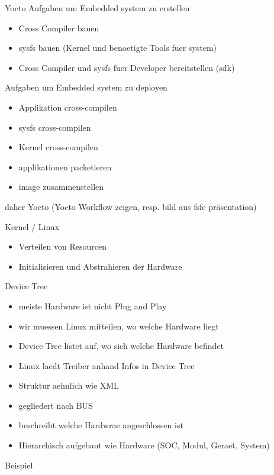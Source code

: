 \begin{frame}{Yocto}
	Aufgaben um Embedded system zu erstellen
	\begin{itemize}
		\item Cross Compiler bauen
		\item sysfs bauen (Kernel und benoetigte Tools fuer system)
		\item Cross Compiler und sysfs fuer Developer bereitstellen (sdk)
	\end{itemize}
	Aufgaben um Embedded system zu deployen
	\begin{itemize}
		\item Applikation cross-compilen
		\item sysfs cross-compilen
		\item Kernel cross-compilen
		\item applikationen packetieren
		\item image zusammenstellen
	\end{itemize}
	daher Yocto (Yocto Workflow zeigen, resp. bild aus fsfe präsentation)
\end{frame}

\begin{frame}{Kernel / Linux}
	\begin{itemize}
		\item Verteilen von Resourcen
		\item Initialisieren und Abstrahieren der Hardware
	\end{itemize}
\end{frame}

\begin{frame}{Device Tree}
	\begin{itemize}
		\item meiste Hardware ist nicht Plug and Play
		\item wir muessen Linux mitteilen, wo welche Hardware liegt
		\item Device Tree listet auf, wo sich welche Hardware befindet
		\item Linux laedt Treiber anhand Infos in Device Tree
	\end{itemize}
	\begin{itemize}
		\item Struktur aehnlich wie XML
		\item gegliedert nach BUS
		\item beschreibt welche Hardwrae angeschlossen ist
		\item Hierarchisch aufgebaut wie Hardware (SOC, Modul, Geraet, System)
	\end{itemize}
	Beispiel
\end{frame}
